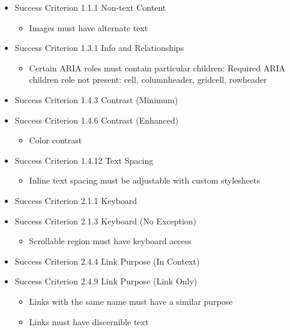 \documentclass{master_thesis}
\begin{document}
\begin{itemize}
	\item Success Criterion 1.1.1 Non-text Content
	\begin{itemize}
		\item Images must have alternate text
	\end{itemize}

	\item Success Criterion 1.3.1 Info and Relationships
	\begin{itemize}
		\item Certain ARIA roles must contain particular children: Required ARIA children role not present: cell, columnheader, gridcell, rowheader
	\end{itemize}

	\item Success Criterion 1.4.3 Contrast (Minimum)
	\item Success Criterion 1.4.6 Contrast (Enhanced)
	\begin{itemize}
		\item Color contrast
	\end{itemize}

	\item Success Criterion 1.4.12 Text Spacing
	\begin{itemize}
		\item Inline text spacing must be adjustable with custom stylesheets
	\end{itemize}

	\item Success Criterion 2.1.1 Keyboard
	\item Success Criterion 2.1.3 Keyboard (No Exception)
	\begin{itemize}
		\item Scrollable region must have keyboard access
	\end{itemize}

	\item Success Criterion 2.4.4 Link Purpose (In Context)
	\item Success Criterion 2.4.9 Link Purpose (Link Only)
	\begin{itemize}
		\item Links with the same name must have a similar purpose
		\item Links must have discernible text
	\end{itemize}


\end{itemize}
\end{document}
